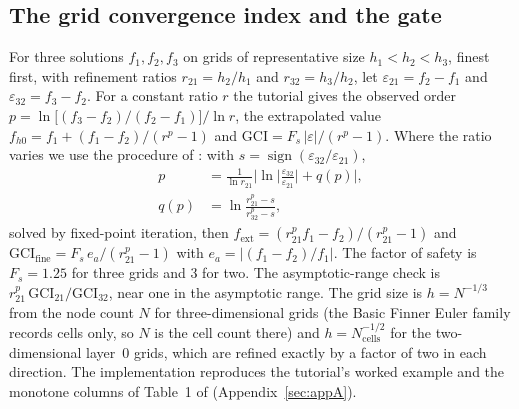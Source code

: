 \documentclass[twocolumn]{labreport}
\newcommand{\fine}{\mathrm{fine}}
\begin{document}
\subsection{The grid convergence index and the gate}
\label{sec:gci}

For three solutions $f_1,f_2,f_3$ on grids of representative size $h_1<h_2<h_3$, finest first, with refinement ratios $r_{21}=h_2/h_1$ and $r_{32}=h_3/h_2$, let $\varepsilon_{21}=f_2-f_1$ and $\varepsilon_{32}=f_3-f_2$.
For a constant ratio $r$ the tutorial gives the observed order $p=\ln\!\big[(f_3-f_2)/(f_2-f_1)\big]/\ln r$, the extrapolated value $f_{h0}=f_1+(f_1-f_2)/(r^p-1)$ and $\mathrm{GCI}=F_s\,|\varepsilon|/(r^p-1)$.
Where the ratio varies we use the procedure of \citet{celik2008}: with $s=\operatorname{sign}(\varepsilon_{32}/\varepsilon_{21})$,
\begin{equation}
\label{eq:celik}
\begin{aligned}
p&=\frac{1}{\ln r_{21}}\Big|\ln\Big|\frac{\varepsilon_{32}}{\varepsilon_{21}}\Big|+q(p)\Big|,\\
q(p)&=\ln\frac{r_{21}^{p}-s}{r_{32}^{p}-s},
\end{aligned}
\end{equation}
solved by fixed-point iteration, then $f_\mathrm{ext}=(r_{21}^{p}f_1-f_2)/(r_{21}^{p}-1)$ and $\mathrm{GCI}_\fine=F_s\,e_a/(r_{21}^{p}-1)$ with $e_a=|(f_1-f_2)/f_1|$.
The factor of safety is $F_s=1.25$ for three grids and $3$ for two.
The asymptotic-range check is $r_{21}^{p}\,\mathrm{GCI}_{21}/\mathrm{GCI}_{32}$, near one in the asymptotic range.
The grid size is $h=N^{-1/3}$ from the node count $N$ for three-dimensional grids (the Basic Finner Euler family records cells only, so $N$ is the cell count there) and $h=N_\mathrm{cells}^{-1/2}$ for the two-dimensional layer~0 grids, which are refined exactly by a factor of two in each direction.
The implementation reproduces the tutorial's worked example and the monotone columns of Table~1 of \citet{celik2008} (Appendix~\ref{sec:appA}).
\end{document}
